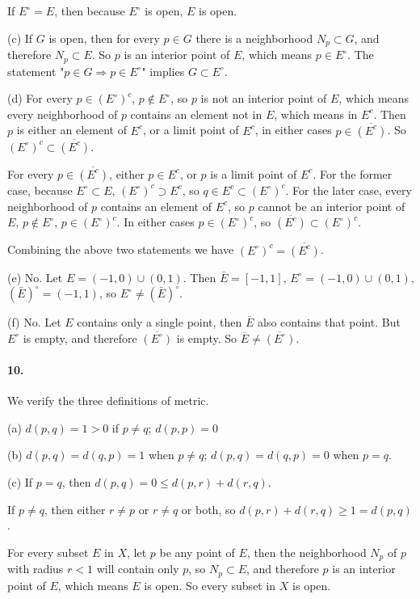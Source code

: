 \documentclass[a4paper]{article}
\begin{document}
If $E^\circ=E$, then because $E^\circ$ is open, $E$ is open.
\medskip

(c) If $G$ is open, then for every $p\in G$ there is a neighborhood $N_p\subset G$, and therefore $N_p\subset E$. So $p$ is an interior point of $E$, which means $p\in E^\circ$. The statement "$ p\in G\Rightarrow p\in E^\circ$" implies $G\subset E^\circ$.
\medskip

(d)
For every $p\in(E^\circ)^c$, $p\not\in E^\circ$, so $p$ is not an interior point of $E$, which means every neighborhood of $p$ contains an element not in $E$, which means in $E^c$. Then $p$ is either an element of $E^c$, or a limit point of $E^c$, in either cases $p\in\overline{(E^c)}$. So $(E^\circ)^c\subset\overline{(E^c)}$.
 
For every $p\in\overline{(E^c)}$, either $p\in E^c$, or $p$ is a limit point of $E^c$. For the former case, because $E^\circ\subset E$, $(E^\circ)^c\supset E^c$, so $q\in E^c\subset (E^\circ)^c$. For the later case, every neighborhood of $p$ contains an element of $E^c$, so $p$ cannot be an interior point of $E$, $p\not\in E^\circ$, $p\in(E^\circ)^c$. In either cases $p\in(E^\circ)^c$, so $\overline{(E^c)}\subset(E^\circ)^c$.

Combining the above two statements we have $(E^\circ)^c=\overline{(E^c)}$.
\medskip

(e) No. Let $E=(-1,0)\cup(0,1)$. Then $\bar{E}=[-1,1]$, $E^\circ=(-1,0)\cup(0,1)$, $(\bar{E})^\circ=(-1,1)$, so $E^\circ\neq(\bar{E})^\circ.$
\medskip

(f) No. Let $E$ contains only a single point, then $\bar{E}$ also contains that point. But $E^\circ$ is empty, and therefore $\overline{(E^\circ)}$ is empty. So $\overline{E}\neq\overline{(E^\circ)}$.

\paragraph{10.}
We verify the three definitions of metric. 

(a) $d(p,q)=1>0$ if $p\neq q$; $d(p,p)=0$

(b) $d(p,q)=d(q,p)=1$ when $p\neq q$; $d(p,q)=d(q,p)=0$ when $p=q$.

(c) If $p=q$, then $d(p,q)=0\leq d(p,r)+d(r,q)$.

\quad\; If $p\neq q$, then either $r\neq p$ or $r\neq q$ or both, so $d(p,r)+d(r,q)\geq1=d(p,q)$.
\medskip

For every subset $E$ in $X$, let $p$ be any point of $E$, then the neighborhood $N_p$ of $p$ with radius $r<1$ will contain only $p$, so $N_p\subset E$, and therefore $p$ is an interior point of $E$, which means $E$ is open. So every subset in $X$ is open.
\end{document}
